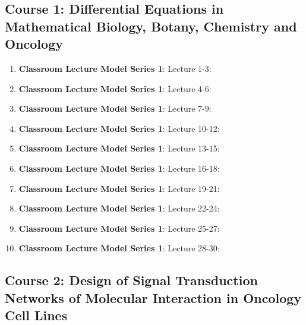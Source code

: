 \documentclass{ResumeDesignFormat1}
\begin{document}
\subsection{Course 1: Differential Equations in Mathematical Biology, Botany, Chemistry and Oncology}

\begin{enumerate}
\item \textbf{Classroom Lecture Model Series 1}: \textcolor{c2}{Lecture 1-3:}
\item \textbf{Classroom Lecture Model Series 1}: \textcolor{c2}{Lecture 4-6:}
\item \textbf{Classroom Lecture Model Series 1}: \textcolor{c2}{Lecture 7-9:}
\item \textbf{Classroom Lecture Model Series 1}: \textcolor{c2}{Lecture 10-12:}
\item \textbf{Classroom Lecture Model Series 1}: \textcolor{c2}{Lecture 13-15:}
\item \textbf{Classroom Lecture Model Series 1}: \textcolor{c2}{Lecture 16-18:}
\item \textbf{Classroom Lecture Model Series 1}: \textcolor{c2}{Lecture 19-21:}
\item \textbf{Classroom Lecture Model Series 1}: \textcolor{c2}{Lecture 22-24:}
\item \textbf{Classroom Lecture Model Series 1}: \textcolor{c2}{Lecture 25-27:}
\item \textbf{Classroom Lecture Model Series 1}: \textcolor{c2}{Lecture 28-30:}
\end{enumerate}

\subsection{Course 2: Design of Signal Transduction Networks of Molecular Interaction in Oncology Cell Lines}
\end{document}

